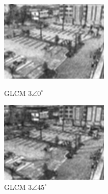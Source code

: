 \documentclass[10pt,twocolumn,letterpaper]{article}
\begin{document}
\begin{figure}[!htb]
  \includegraphics[width=\linewidth]{GLCM0-Homogeneidade.jpg}
  \caption{GLCM $3\angle 0^{\circ}$}\label{fig:glcm0}
\endminipage\hfill
{}
  \includegraphics[width=\linewidth]{GLCM45-Homogeneidade.jpg}
  \caption{GLCM $3\angle 45^{\circ}$}\label{fig:glcm45}
\endminipage
\end{figure}
\end{document}
